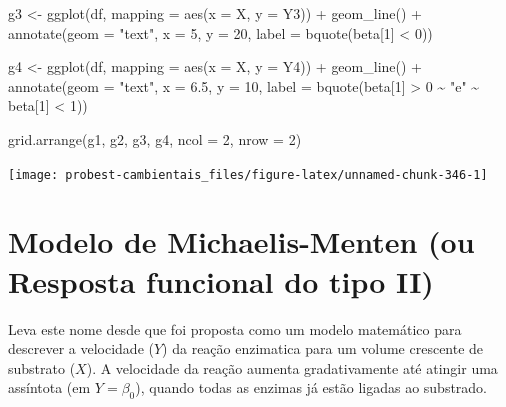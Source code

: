 \documentclass[
]{book}
\newenvironment{Shaded}{\begin{snugshade}}{\end{snugshade}}
\newcommand{\AttributeTok}[1]{\textcolor[rgb]{0.77,0.63,0.00}{#1}}
\newcommand{\DecValTok}[1]{\textcolor[rgb]{0.00,0.00,0.81}{#1}}
\newcommand{\FloatTok}[1]{\textcolor[rgb]{0.00,0.00,0.81}{#1}}
\newcommand{\FunctionTok}[1]{\textcolor[rgb]{0.00,0.00,0.00}{#1}}
\newcommand{\NormalTok}[1]{#1}
\newcommand{\OtherTok}[1]{\textcolor[rgb]{0.56,0.35,0.01}{#1}}
\newcommand{\SpecialCharTok}[1]{\textcolor[rgb]{0.00,0.00,0.00}{#1}}
\newcommand{\StringTok}[1]{\textcolor[rgb]{0.31,0.60,0.02}{#1}}
\begin{document}
\begin{Shaded}
\begin{Highlighting}[]
\NormalTok{g3 }\OtherTok{\textless{}{-}} \FunctionTok{ggplot}\NormalTok{(df, }\AttributeTok{mapping =} \FunctionTok{aes}\NormalTok{(}\AttributeTok{x =}\NormalTok{ X, }\AttributeTok{y =}\NormalTok{ Y3)) }\SpecialCharTok{+}
  \FunctionTok{geom\_line}\NormalTok{() }\SpecialCharTok{+}
  \FunctionTok{annotate}\NormalTok{(}\AttributeTok{geom =} \StringTok{"text"}\NormalTok{, }\AttributeTok{x =} \DecValTok{5}\NormalTok{, }\AttributeTok{y =} \DecValTok{20}\NormalTok{, }
           \AttributeTok{label =} \FunctionTok{bquote}\NormalTok{(beta[}\DecValTok{1}\NormalTok{] }\SpecialCharTok{\textless{}} \DecValTok{0}\NormalTok{))}

\NormalTok{g4 }\OtherTok{\textless{}{-}} \FunctionTok{ggplot}\NormalTok{(df, }\AttributeTok{mapping =} \FunctionTok{aes}\NormalTok{(}\AttributeTok{x =}\NormalTok{ X, }\AttributeTok{y =}\NormalTok{ Y4)) }\SpecialCharTok{+}
  \FunctionTok{geom\_line}\NormalTok{() }\SpecialCharTok{+}
  \FunctionTok{annotate}\NormalTok{(}\AttributeTok{geom =} \StringTok{"text"}\NormalTok{, }\AttributeTok{x =} \FloatTok{6.5}\NormalTok{, }\AttributeTok{y =} \DecValTok{10}\NormalTok{, }
           \AttributeTok{label =} \FunctionTok{bquote}\NormalTok{(beta[}\DecValTok{1}\NormalTok{] }\SpecialCharTok{\textgreater{}} \DecValTok{0} \SpecialCharTok{\textasciitilde{}} \StringTok{"e"} \SpecialCharTok{\textasciitilde{}}\NormalTok{ beta[}\DecValTok{1}\NormalTok{] }\SpecialCharTok{\textless{}} \DecValTok{1}\NormalTok{))}

\FunctionTok{grid.arrange}\NormalTok{(g1, g2, g3, g4, }\AttributeTok{ncol =} \DecValTok{2}\NormalTok{, }\AttributeTok{nrow =} \DecValTok{2}\NormalTok{)}
\end{Highlighting}
\end{Shaded}

\begin{center}\texttt{[image: probest-cambientais\_files/figure-latex/unnamed-chunk-346-1]} \end{center}

\hypertarget{modelo-de-michaelis-menten-ou-resposta-funcional-do-tipo-ii}{%
\section{Modelo de Michaelis-Menten (ou Resposta funcional do tipo II)}\label{modelo-de-michaelis-menten-ou-resposta-funcional-do-tipo-ii}}

Leva este nome desde que foi proposta como um modelo matemático para descrever a velocidade (\(Y\)) da reação enzimatica para um volume crescente de substrato (\(X\)). A velocidade da reação aumenta gradativamente até atingir uma assíntota (em \(Y = \beta_0\)), quando todas as enzimas já estão ligadas ao substrado.
\end{document}
